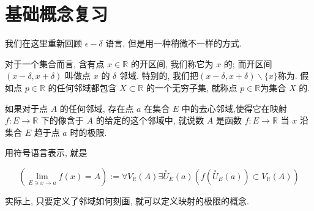 \documentclass{ctexart}
\begin{document}
\section{基础概念复习}

我们在这里重新回顾 $\epsilon-\delta$ 语言, 但是用一种稍微不一样的方式.

对于一个集合而言, 含有点 $x \in \mathbb{R}$ 的开区间, 我们称它为 $x$ 的; 而开区间 $( x-\delta, x+\delta )$ 叫做点 $x$ 的 $\delta$ 邻域. 特别的, 我们把$( x-\delta, x+\delta )\backslash \{x\}$称为. 
假如点 $p \in \mathbb{R}$ 的任何邻域都包含 $X \subset \mathbb{R}$ 的一个无穷子集, 就称点 $p \in \mathbb{R}$为集合 $X$ 的. 

如果对于点 $A$ 的任何邻域, 存在点 $a$ 在集合 $E$ 中的去心邻域,使得它在映射 $f: E \rightarrow \mathbb{R}$ 下的像含于 $A$ 的给定的这个邻域中, 就说数 $A$ 是函数 $f: E \rightarrow \mathbb{R}$ 当 $x$ 沿集合 $E$ 趋于点 $a$ 时的极限. 

用符号语言表示, 就是

\[
\left(\lim _{E \ni x \rightarrow a} f(x)=A\right):=\forall V_{\mathbb{R}}(A) \exists \stackrel{\circ}{U}_E(a)\left(f\left(\stackrel{\circ}{U}_E(a)\right) \subset V_{\mathbb{R}}(A)\right)
\]

实际上, 只要定义了邻域如何刻画, 就可以定义映射的极限的概念. 
\end{document}

